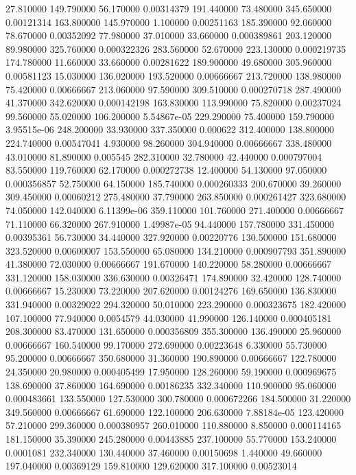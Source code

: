 27.810000	149.790000	56.170000	0.00314379
191.440000	73.480000	345.650000	0.00121314
163.800000	145.970000	1.100000	0.00251163
185.390000	92.060000	78.670000	0.00352092
77.980000	37.010000	33.660000	0.000389861
203.120000	89.980000	325.760000	0.000322326
283.560000	52.670000	223.130000	0.000219735
174.780000	11.660000	33.660000	0.00281622
189.900000	49.680000	305.960000	0.00581123
15.030000	136.020000	193.520000	0.00666667
213.720000	138.980000	75.420000	0.00666667
213.060000	97.590000	309.510000	0.000270718
287.490000	41.370000	342.620000	0.000142198
163.830000	113.990000	75.820000	0.00237024
99.560000	55.020000	106.200000	5.54867e-05
229.290000	75.400000	159.790000	3.95515e-06
248.200000	33.930000	337.350000	0.000622
312.400000	138.800000	224.740000	0.00547041
4.930000	98.260000	304.940000	0.00666667
338.480000	43.010000	81.890000	0.005545
282.310000	32.780000	42.440000	0.000797004
83.550000	119.760000	62.170000	0.000272738
12.400000	54.130000	97.050000	0.000356857
52.750000	64.150000	185.740000	0.000260333
200.670000	39.260000	309.450000	0.00060212
275.480000	37.790000	263.850000	0.000261427
323.680000	74.050000	142.040000	6.11399e-06
359.110000	101.760000	271.400000	0.00666667
71.110000	66.320000	267.910000	1.49987e-05
94.440000	157.780000	331.450000	0.00395361
56.730000	34.440000	327.920000	0.00220776
130.500000	151.680000	323.520000	0.00600007
153.550000	65.080000	134.210000	0.000907793
351.890000	41.380000	72.030000	0.00666667
191.670000	140.220000	58.280000	0.00666667
331.120000	158.030000	336.630000	0.00326471
174.890000	32.420000	128.740000	0.00666667
15.230000	73.220000	207.620000	0.00124276
169.650000	136.830000	331.940000	0.00329022
294.320000	50.010000	223.290000	0.000323675
182.420000	107.100000	77.940000	0.0054579
44.030000	41.990000	126.140000	0.000405181
208.300000	83.470000	131.650000	0.000356809
355.300000	136.490000	25.960000	0.00666667
160.540000	99.170000	272.690000	0.00223648
6.330000	55.730000	95.200000	0.00666667
350.680000	31.360000	190.890000	0.00666667
122.780000	24.350000	20.980000	0.000405499
17.950000	128.260000	59.190000	0.000969675
138.690000	37.860000	164.690000	0.00186235
332.340000	110.900000	95.060000	0.000483661
133.550000	127.530000	300.780000	0.000672266
184.500000	31.220000	349.560000	0.00666667
61.690000	122.100000	206.630000	7.88184e-05
123.420000	57.210000	299.360000	0.000380957
260.010000	110.880000	8.850000	0.000114165
181.150000	35.390000	245.280000	0.00443885
237.100000	55.770000	153.240000	0.0001081
232.340000	130.440000	37.460000	0.00150698
1.440000	49.660000	197.040000	0.00369129
159.810000	129.620000	317.100000	0.00523014
